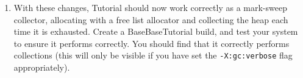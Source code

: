 \documentclass[textsize=14pt]{article}
\newcommand{\code}[1]{\texttt{#1}}
\begin{document}
\begin{itemize}
\begin{enumerate}
\begin{enumerate}
    \end{enumerate}

    \item With these changes, Tutorial should now work correctly as a
    mark-sweep collector, allocating with a free list allocator and
    collecting the heap each time it is exhausted. Create a
    BaseBaseTutorial build, and test your system to ensure it performs
    correctly.  You should find that it correctly performs
    collections (this will only be visible if you have set the
    \code{-X:gc:verbose} flag appropriately).

    \end{enumerate}
\end{itemize}


%
%
%
\end{document}
